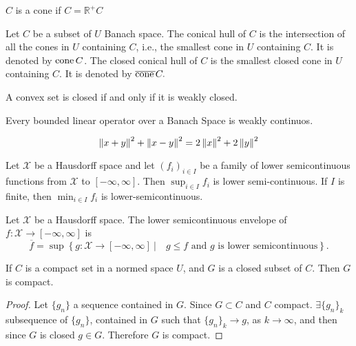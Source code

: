 
\begin{definition}
	$C$ is a cone if $C=\mathbb{R}^+C$
\end{definition}
\begin{definition}
Let $C$ be a subset of $U$ Banach space. The conical hull of $C$ is the intersection of all the cones in $U$ containing $C$, i.e., the smallest cone in $U$ containing $C$. It is denoted by $\mathrm{cone\,} C$. The closed conical hull of $C$ is the smallest closed cone in $U$ containing $C$. It is denoted by $\overline{\mathrm{cone\,}} C.$
\end{definition}

\begin{lemma}
	A convex set is closed if and only if it is weakly closed.
\end{lemma}

\begin{lemma}
	Every bounded linear operator over a Banach Space is weakly continuos.
\end{lemma}

\begin{lemma}
	
\[
\left\lVert x+y\right\rVert^2 +\left\lVert x-y\right\rVert^2 = 2\left\lVert x\right\rVert^2+2\left\lVert y\right\rVert^2
\]
\end{lemma}

\begin{lemma}
	Let $\mathcal{X}$ be a Hausdorff space and let $(f_i)_{i \in I}$ be a family of lower semicontinuous functions from $\mathcal{X}$ to $[-\infty, \infty]$. Then $\sup_{i\in I}f_i$ is lower semi-continuous. If $I$ is finite, then $\min_{i\in I}f_i$ is lower-semicontinuous.
\end{lemma}
\begin{definition}
	Let $\mathcal{X}$ be a Hausdorff space. The lower semicontinuous envelope of $f: \mathcal{X}\rightarrow[-\infty, \infty]$ is 
	\[
	\overline{f}=\sup \left\lbrace g: \mathcal{X}\rightarrow[-\infty, \infty] \ |\quad  g\leq f \text{ and } g \text{ is lower semicontinuous}\right\rbrace.
	\]
\end{definition}
\begin{proposition}
	If $C$ is a compact set in a normed space $U$, and $G$ is a closed subset of $C$. Then $G$ is compact.
	\begin{proof}
		Let $\{ g_n\}$ a sequence contained in $G$. Since $G \subset C$ and $C$ compact. $\exists \{g_n\}_k$ subsequence of $\{g_n\}$, contained in $G$ such that $\{g_n\}_k \rightarrow g$, as $k \rightarrow \infty$, and then since $G$ is closed $g \in G$. Therefore $G$ is compact.
	\end{proof}
	\label{prop0. closed subset compact. Precompact}
\end{proposition}

